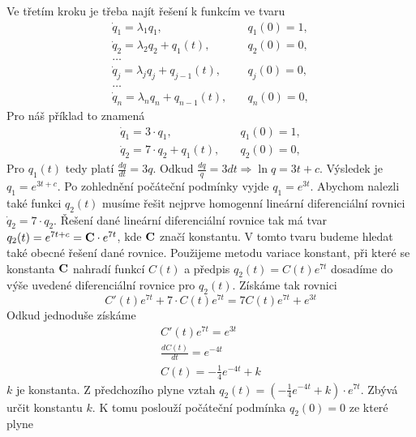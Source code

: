 Ve třetím kroku je třeba najít řešení k funkcím ve tvaru
\begin{equation*}
 \begin{array}{cc}
  \dot{q}_1 = \lambda_1 q_1, & \quad q_1(0) = 1,\\
  \dot{q}_2 = \lambda_2 q_2 + q_1(t), & \quad q_2(0) = 0,\\
  \ldots & \\
  \dot{q}_j = \lambda_j q_j + q_{j-1}(t),& \quad q_j(0) = 0,\\
  \ldots & \\
  \dot{q}_n = \lambda_n q_n + q_{n-1}(t), & \quad q_n(0) = 0,
 \end{array}
\end{equation*}
Pro náš příklad to znamená
\begin{equation*}
 \begin{array}{cc}
  \dot{q}_1 = 3\cdot q_1,&\quad q_1(0) = 1,\\
  \dot{q}_2 = 7\cdot q_2 + q_1(t),&\quad q_2(0) = 0,
 \end{array}
\end{equation*}
Pro $q_1(t)$ tedy platí $\frac{dq}{dt} = 3q$. Odkud $\frac{dq}{q} = 3dt \Rightarrow \ln{q} = 3t + c$. Výsledek je $q_1 = e^{3t + c}$. Po zohlednění počáteční podmínky vyjde $q_1 = e^{3t}$. \newline
Abychom nalezli také funkci $q_2(t)$ musíme řešit nejprve homogenní lineární diferenciální rovnici $\dot{q}_2 = 7 \cdot q_2$. Řešení dané lineární diferenciální rovnice tak má tvar $q_2(t) = e^{7t +c} = {\bf C}\cdot e^{7t}$, kde ${\bf C}$ značí konstantu. V tomto tvaru budeme hledat také obecné řešení dané rovnice.\newline
Použijeme metodu variace konstant, při které se konstanta ${\bf C}$ nahradí funkcí $C(t)$ a předpis $q_2(t) = C(t) e^{7t}$ dosadíme do výše uvedené diferenciální rovnice pro $q_2(t)$. Získáme tak rovnici
\[
 C'(t)e^{7t} + 7\cdot C(t)e^{7t} = 7 C(t)e^{7t} + e^{3t}
\]
Odkud jednoduše získáme
\begin{equation*}
 \begin{array}{c}
  C'(t)e^{7t} = e^{3t}\\
  \frac{dC(t)}{dt} = e^{-4t}\\
  C(t) = -\frac{1}{4}e^{-4t} + k
 \end{array}
\end{equation*}
$k$ je konstanta. Z předchozího plyne vztah $q_2(t) = \left( -\frac{1}{4}e^{-4t} + k\right) \cdot e^{7t}$. Zbývá určit konstantu $k$. K tomu poslouží počáteční podmínka $q_2(0) = 0$ ze které plyne
